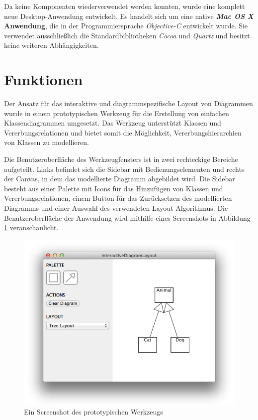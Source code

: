 Da keine Komponenten wiederverwendet werden konnten, wurde eine komplett neue Desktop-Anwendung entwickelt. Es handelt sich um eine native \textbf{\textit{Mac OS X} Anwendung}, die in der Programmiersprache \textit{Objective-C} entwickelt wurde. Sie verwendet ausschließlich die Standardbibliotheken \textit{Cocoa} und \textit{Quartz} und besitzt keine weiteren Abhängigkeiten.

\section{Funktionen}
\label{sec:functions}

Der Ansatz für das interaktive und diagrammspezifische Layout von Diagrammen wurde in einem prototypischen Werkzeug für die Erstellung von einfachen Klassendiagrammen umgesetzt. Das Werkzeug unterstützt Klassen und Vererbungsrelationen und bietet somit die Möglichkeit, Vererbungshierarchien von Klassen zu modellieren.

Die Benutzeroberfläche des Werkzeugfensters ist in zwei rechteckige Bereiche aufgeteilt. Links befindet sich die Sidebar mit Bedienungselementen und rechts der Canvas, in dem das modellierte Diagramm abgebildet wird. Die Sidebar besteht aus einer Palette mit Icons für das Hinzufügen von Klassen und Vererbungsrelationen, einem Button für das Zurücksetzen des modellierten Diagramms und einer Auswahl des verwendeten Layout-Algorithmus. Die Benutzeroberfläche der Anwendung wird mithilfe eines Screenshots in Abbildung \ref{fig:prototype-screenshot} veranschaulicht.

\begin{figure}[hbt]
    \centering
    \includegraphics[scale=0.6]{assets/prototype-screenshot}
    \caption{Ein Screenshot des prototypischen Werkzeugs}
    \label{fig:prototype-screenshot}
\end{figure}

